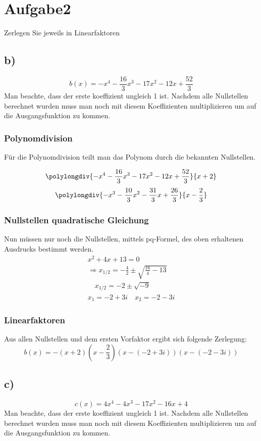 \documentclass[18pt,4paper]{article}
\begin{document}
\section*{Aufgabe2}
Zerlegen Sie jeweils in Linearfaktoren
\subsection*{b)}
\begin{equation*}
	b(x) = -x^4-\frac{16}{3}x^3-17x^2-12x+\frac{52}{3}
\end{equation*}
Man beachte, dass der erste koeffizient ungleich 1 ist. Nachdem alle Nullstellen berechnet wurden muss man noch mit diesem Koeffizienten multiplizieren um auf die Ausgangsfunktion zu kommen.
\subsubsection*{Polynomdivision}
Für die Polynomdivision teilt man das Polynom durch die bekannten Nullstellen.

\[\polylongdiv{-x^4 - \frac{16}{3}x^3 -17x^2 - 12x+\frac{52}{3}}{x+2}\]
\hfill
\[\polylongdiv{-x^3-\frac{10}{3}x^2-\frac{31}{3}x+\frac{26}{3}}{x-\frac{2}{3}}\]

\subsubsection*{Nullstellen quadratische Gleichung}
Nun müssen nur noch die Nullstellen, mittels pq-Formel,  des oben erhaltenen Ausdrucks bestimmt werden.
\begin{align*}
	x^2 + 4x +13 = 0\\
	\Rightarrow x_{1/2} = -\frac{4}{2} \pm \sqrt{\frac{16}{4}-13}\\
	\quad  x_{1/2} = -2 \pm \sqrt{-9}\\
	x_1=-2+3i\quad x_2 = -2-3i
\end{align*}
\subsubsection*{Linearfaktoren}
Aus allen Nullstellen und dem ersten Vorfaktor ergibt sich folgende Zerlegung:
\begin{equation*}
	b(x)=-(x+2)(x-\frac{2}{3})(x-(-2+3i))(x-(-2-3i))
\end{equation*}

\newpage

\subsection*{c)}
\begin{equation*}
	c(x) = 4x^4-4x^3-17x^2-16x+4
\end{equation*}
Man beachte, dass der erste koeffizient ungleich 1 ist. Nachdem alle Nullstellen berechnet wurden muss man noch mit diesem Koeffizienten multiplizieren um auf die Ausgangsfunktion zu kommen.
\end{document}

